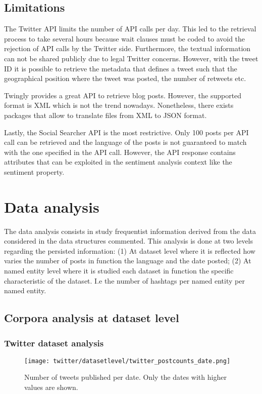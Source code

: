 \subsection{Limitations}

The Twitter API limits the number of API calls per day. This led to the retrieval process to take several hours because wait clauses must be coded to avoid the rejection of API calls by the Twitter side. Furthermore, the textual information can not be shared publicly due to legal Twitter concerns. However, with the tweet ID it is possible to retrieve the metadata that defines a tweet such that the geographical position where the tweet was posted, the number of retweets etc. \\

\par Twingly provides a great API to retrieve blog posts. However, the supported format is XML which is not the trend nowadays. Nonetheless, there exists packages that allow to translate files from XML to JSON format.
\par Lastly, the Social Searcher API is the most restrictive. Only 100 posts per API call can be retrieved and the language of the posts is not guaranteed to match with the one specified in the API call. However, the API response contains attributes that can be exploited in the sentiment analysis context like the sentiment property.

\newpage
\section{Data analysis}



The data analysis consists in study frequentist information derived from the data considered in the data structures commented. This analysis is done at two levels regarding the persisted information: (1) At dataset level where it is reflected how varies the number of posts in function the language and the date posted; (2) At named entity level where it is studied each dataset in function the specific characteristic of the dataset. I.e the number of hashtags per named entity per named entity.
\subsection{Corpora analysis at dataset level}

\subsubsection{Twitter dataset analysis}
\begin{figure}[H]
	\begin{center}
		\texttt{[image: twitter/datasetlevel/twitter\_postcounts\_date.png]}
		\caption{Number of tweets published per date. Only the dates with higher values are shown.}
		\label{fig:twitter_postcounts_date}
	\end{center}
\end{figure}


